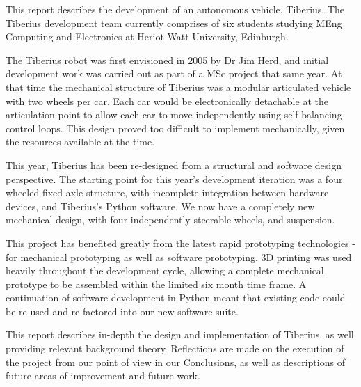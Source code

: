 This report describes the development of an autonomous vehicle, Tiberius. The Tiberius development team currently comprises of six students studying MEng Computing and Electronics at Heriot-Watt University, Edinburgh.
\newline

The Tiberius robot was first envisioned in 2005 by Dr Jim Herd, and initial development work was carried out as part of a MSc project that same year. At that time the mechanical structure of Tiberius was a modular articulated vehicle with two wheels per car. Each car would be electronically detachable at the articulation point to allow each car to move independently using self-balancing control loops. This design proved too difficult to implement mechanically, given the resources available at the time.
\newline

This year, Tiberius has been re-designed from a structural and software design perspective. The starting point for this year's development iteration was a four wheeled fixed-axle structure, with incomplete integration between hardware devices, and Tiberius's Python software. We now have a completely new mechanical design, with four independently steerable wheels, and suspension.
\newline

This project has benefited greatly from the latest rapid prototyping technologies - for mechanical prototyping as well as software prototyping. 3D printing was used heavily throughout the development cycle, allowing a complete mechanical prototype to be assembled within the limited six month time frame. A continuation of software development in Python meant that existing code could be re-used and re-factored into our new software suite.
\newline

This report describes in-depth the design and implementation of Tiberius, as well providing relevant background theory. Reflections are made on the execution of the project from our point of view in our Conclusions, as well as descriptions of future areas of improvement and future work.

\pagebreak
